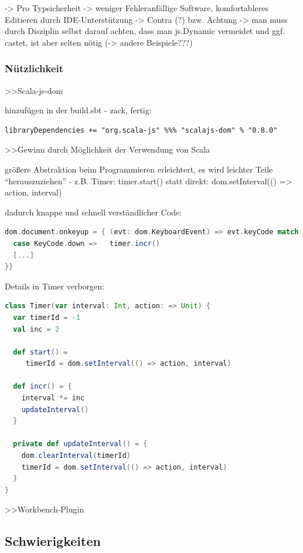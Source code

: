 \documentclass[a4paper, 12pt, hidelinks, listof=totoc, listoftables=totoc, bibliography=totoc]{scrreprt}
\begin{document}
	-> Pro Typsicherheit -> weniger Fehleranfällige Software, komfortableres Editieren durch IDE-Unterstützung
	-> Contra (?) bzw. Achtung ->  man muss durch Disziplin selbst darauf achten, dass man js.Dynamic vermeidet und ggf. castet, ist aber selten nötig (-> andere Beispiele???)


\subsubsection{Nützlichkeit}

>>Scala-js-dom

hinzufügen in der build.sbt - zack, fertig:

\begin{lstlisting}
libraryDependencies += "org.scala-js" %%% "scalajs-dom" % "0.8.0"
\end{lstlisting}


>>Gewinn durch Möglichkeit der Verwendung von Scala


größere Abstraktion beim Programmieren erleichtert, es wird leichter Teile "`herauszuziehen"'
	- z.B. Timer:
		timer.start() statt direkt:
		dom.setInterval(() => action, interval)
		
		dadurch knappe und schnell verständlicher Code:
\begin{lstlisting}[language=Scala]
dom.document.onkeyup = { (evt: dom.KeyboardEvent) => evt.keyCode match {
  case KeyCode.down =>   timer.incr()
  [...]
}}
\end{lstlisting}

		Details in Timer verborgen:
		
\begin{lstlisting}[language=Scala]
class Timer(var interval: Int, action: => Unit) {
  var timerId = -1
  val inc = 2

  def start() =
     timerId = dom.setInterval(() => action, interval)
   
  def incr() = {
    interval *= inc
    updateInterval()
  }

  private def updateInterval() = {
    dom.clearInterval(timerId)
    timerId = dom.setInterval(() => action, interval)
  }
}
\end{lstlisting}


>>Workbench-Plugin



\subsection{Schwierigkeiten}
\end{document}
